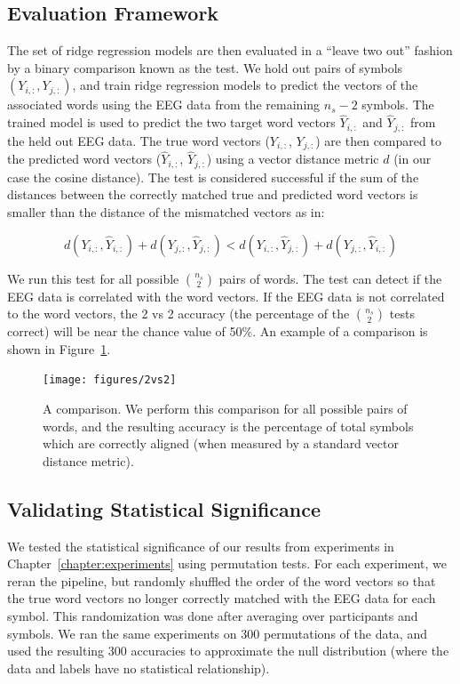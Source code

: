 \subsection{Evaluation Framework}
The set of ridge regression models are then evaluated in a ``leave two out'' 
fashion by a binary comparison known as the \tvt test. We hold out pairs of 
symbols $(Y_{i,:}, Y_{j,:})$, and train ridge regression models to predict the 
vectors of the associated words using the EEG data from the remaining $n_s-2$ 
symbols.  The trained model is used to predict the two target word vectors 
$\hat{Y}_{i,:}$ and $\hat{Y}_{j,:}$ from the held out EEG data. The true word 
vectors ($Y_{i,:}$, $Y_{j,:}$) are then compared to the predicted word vectors 
($\hat{Y}_{i,:}$, $\hat{Y}_{j,:}$) using a vector distance metric $d$ (in our 
case the cosine distance). The \tvt test is considered successful if the sum of 
the distances between the correctly matched true and predicted word vectors is 
smaller than the distance of the mismatched vectors as in: 
  
\begin{equation}
  d(Y_{i,:}, \hat{Y}_{i,:}) + d(Y_{j,:}, \hat{Y}_{j,:}) < 
  d(Y_{i,:}, \hat{Y}_{j,:}) + d(Y_{j,:}, \hat{Y}_{i,:})
  \label{eq:2vs2}
\end{equation}

\noindent We run this test for all possible ${\binom{n_s}{2}}$ pairs of words.  
The \tvt test can detect if the EEG data is correlated with the word vectors.  
If the EEG data is not correlated to the word vectors, the 2 vs 2 accuracy (the 
percentage of the ${\binom{n_s}{2}}$ \tvt tests correct) will be  near the 
chance value of 50\%. An example of a \tvt comparison is shown in Figure~\ref{fig:2vs2}. 

\begin{figure}[!t]
  \centering
  \texttt{[image: figures/2vs2]}
  \caption[The \tvt Comparison]{
    A \tvt comparison. We perform this comparison for all possible pairs of 
    words, and the resulting \tvt accuracy is the percentage of total symbols 
    which are correctly aligned (when measured by a standard vector distance 
    metric).
  }
  \label{fig:2vs2}
\end{figure}

\subsection{Validating Statistical Significance}
We tested the statistical significance of our results from experiments in 
Chapter~\ref{chapter:experiments} using permutation tests. For each experiment, 
we reran the pipeline, but randomly shuffled the order of the word vectors so 
that the true word vectors no longer correctly matched with the EEG data for 
each symbol. This randomization was done after averaging over participants and 
symbols. We ran the same experiments on 300 permutations of the data, and used 
the resulting 300 \tvt accuracies to approximate the null distribution (where 
the data and labels have no statistical relationship). 
  
